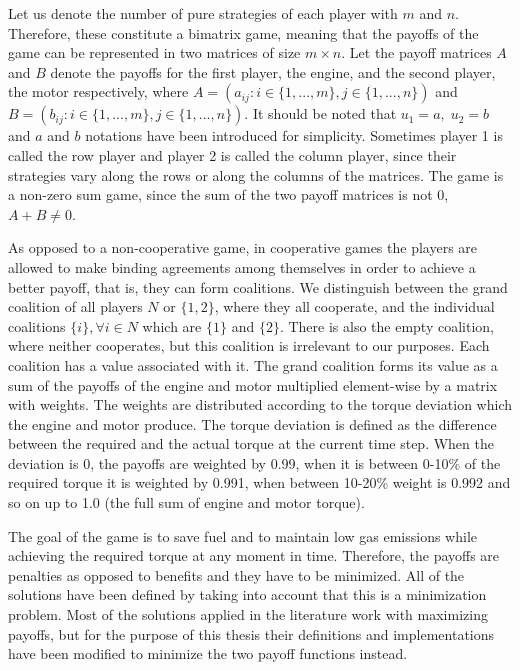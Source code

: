 Let us denote the number of pure strategies of each player with $m$ and $n$. Therefore, these constitute a bimatrix game, meaning that the payoffs of the game can be represented in two matrices of size $m \times n$. Let the payoff matrices $A$ and $B$ denote the payoffs for the first player, the engine, and the second player, the motor respectively, where $A = (a_{ij}: i \in \{1,...,m\}, j \in \{ 1,...,n\})$ and $B = (b_{ij}: i \in \{1,...,m\}, j \in \{ 1,...,n\})$. It should be noted that $u_1 = a, \; u_2 = b$ and $a$ and $b$ notations have been introduced for simplicity. Sometimes player 1 is called the row player and player 2 is called the column player, since their strategies vary along the rows or along the columns of the matrices. The game is a non-zero sum game, since the sum of the two payoff matrices is not 0, $A + B \neq 0$.

As opposed to a non-cooperative game, in cooperative games the players are allowed to make binding agreements among themselves in order to achieve a better payoff, that is, they can form coalitions. We distinguish between the grand coalition of all players $N$ or $\{1,2\}$, where they all cooperate, and the individual coalitions $\{i\}, \forall i \in N$ which are $\{1\}$ and $\{2\}$. There is also the empty coalition, where neither cooperates, but this coalition is irrelevant to our purposes. Each coalition has a value associated with it. The grand coalition forms its value as a sum of the payoffs of the engine and motor multiplied element-wise by a matrix with weights. The weights are distributed according to the torque deviation which the engine and motor produce. The torque deviation is defined as the difference between the required and the actual torque at the current time step. When the deviation is 0, the payoffs are weighted by 0.99, when it is between 0-10\% of the required torque it is weighted by 0.991, when between 10-20\% weight is 0.992 and so on up to 1.0 (the full sum of engine and motor torque).


The goal of the game is to save fuel and to maintain low gas emissions while achieving the required torque at any moment in time. Therefore, the payoffs are penalties as opposed to benefits and they have to be minimized. All of the solutions have been defined by taking into account that this is a minimization problem. Most of the solutions applied in the literature work with maximizing payoffs, but for the purpose of this thesis their definitions and implementations have been modified to minimize the two payoff functions instead. 


